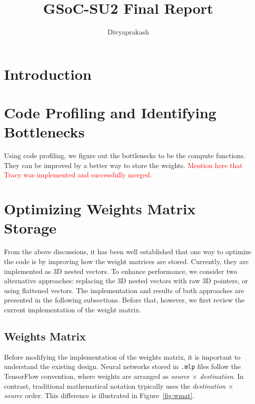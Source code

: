 \documentclass{article}
\title{GSoC-SU2 Final Report}
\author{Divyaprakash}
\newcommand{\tr}[1]{\textcolor{red}{#1}}
\begin{document}
\maketitle


\section{Introduction}





\section{Code Profiling and Identifying Bottlenecks}
Using code profiling, we figure out the bottlenecks to be the compute functions. They can be improved by a better way to store the weights. \tr{Mention here that Tracy was implemented and successfully merged.}

\section{Optimizing Weights Matrix Storage}
From the above discussions, it has been well established that one way to optimize the code is by improving how the weight matrices are stored. Currently, they are implemented as 3D nested vectors. To enhance performance, we consider two alternative approaches: replacing the 3D nested vectors with raw 3D pointers, or using flattened vectors. The implementation and results of both approaches are presented in the following subsections. Before that, however, we first review the current implementation of the weight matrix.

\subsection{Weights Matrix}
Before modifying the implementation of the weights matrix, it is important to understand the existing design. Neural networks stored in \texttt{.mlp} files follow the TensorFlow convention, where weights are arranged as \emph{source $\times$ destination}. In contrast, traditional mathematical notation typically uses the \emph{destination $\times$ source} order. This difference is illustrated in Figure~\ref{fig:wmat}.
\end{document}
